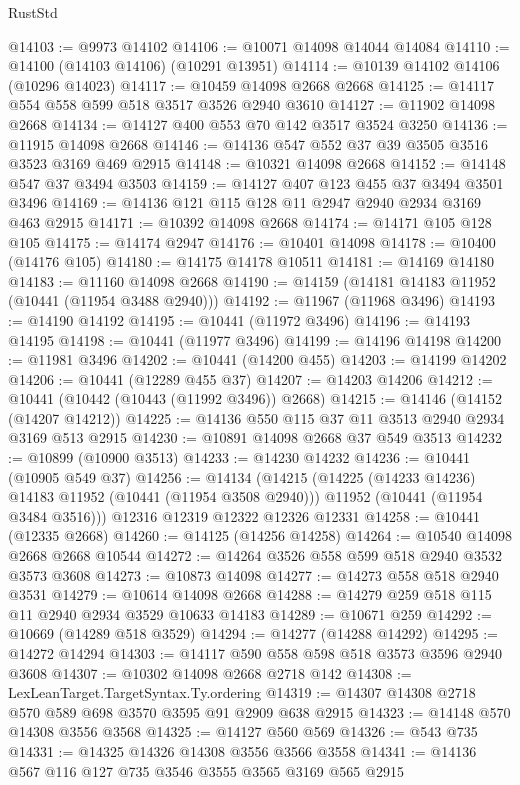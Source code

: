 \begin{lexlean}{RustStd}
\begin{coremodule}
@14103 := @9973 @14102
@14106 := @10071 @14098 @14044 @14084
@14110 := @14100 (@14103 @14106) (@10291 @13951)
@14114 := @10139 @14102 @14106 (@10296 @14023)
@14117 := @10459 @14098 @2668 @2668
@14125 := @14117 @554 @558 @599 @518 @3517 @3526 @2940 @3610
@14127 := @11902 @14098 @2668
@14134 := @14127 @400 @553 @70 @142 @3517 @3524 @3250
@14136 := @11915 @14098 @2668
@14146 := @14136 @547 @552 @37 @39 @3505 @3516 @3523 @3169 @469 @2915
@14148 := @10321 @14098 @2668
@14152 := @14148 @547 @37 @3494 @3503
@14159 := @14127 @407 @123 @455 @37 @3494 @3501 @3496
@14169 := @14136 @121 @115 @128 @11 @2947 @2940 @2934 @3169 @463 @2915
@14171 := @10392 @14098 @2668
@14174 := @14171 @105 @128 @105
@14175 := @14174 @2947
@14176 := @10401 @14098
@14178 := @10400 (@14176 @105)
@14180 := @14175 @14178 @10511
@14181 := @14169 @14180
@14183 := @11160 @14098 @2668
@14190 := @14159 (@14181 @14183 @11952 (@10441 (@11954 @3488 @2940)))
@14192 := @11967 (@11968 @3496)
@14193 := @14190 @14192
@14195 := @10441 (@11972 @3496)
@14196 := @14193 @14195
@14198 := @10441 (@11977 @3496)
@14199 := @14196 @14198
@14200 := @11981 @3496
@14202 := @10441 (@14200 @455)
@14203 := @14199 @14202
@14206 := @10441 (@12289 @455 @37)
@14207 := @14203 @14206
@14212 := @10441 (@10442 (@10443 (@11992 @3496)) @2668)
@14215 := @14146 (@14152 (@14207 @14212))
@14225 := @14136 @550 @115 @37 @11 @3513 @2940 @2934 @3169 @513 @2915
@14230 := @10891 @14098 @2668 @37 @549 @3513
@14232 := @10899 (@10900 @3513)
@14233 := @14230 @14232
@14236 := @10441 (@10905 @549 @37)
@14256 := @14134
    (@14215
      (@14225 (@14233 @14236) @14183 @11952 (@10441 (@11954 @3508 @2940)))
      @11952
      (@10441 (@11954 @3484 @3516)))
    @12316
    @12319
    @12322
    @12326
    @12331
@14258 := @10441 (@12335 @2668)
@14260 := @14125 (@14256 @14258)
@14264 := @10540 @14098 @2668 @2668 @10544
@14272 := @14264 @3526 @558 @599 @518 @2940 @3532 @3573 @3608
@14273 := @10873 @14098
@14277 := @14273 @558 @518 @2940 @3531
@14279 := @10614 @14098 @2668
@14288 := @14279 @259 @518 @115 @11 @2940 @2934 @3529 @10633 @14183
@14289 := @10671 @259
@14292 := @10669 (@14289 @518 @3529)
@14294 := @14277 (@14288 @14292)
@14295 := @14272 @14294
@14303 := @14117 @590 @558 @598 @518 @3573 @3596 @2940 @3608
@14307 := @10302 @14098 @2668 @2718 @142
@14308 := LexLeanTarget.TargetSyntax.Ty.ordering
@14319 := @14307 @14308 @2718 @570 @589 @698 @3570 @3595 @91 @2909 @638 @2915
@14323 := @14148 @570 @14308 @3556 @3568
@14325 := @14127 @560 @569
@14326 := @543 @735
@14331 := @14325 @14326 @14308 @3556 @3566 @3558
@14341 := @14136 @567 @116 @127 @735 @3546 @3555 @3565 @3169 @565 @2915

\end{coremodule}
\end{lexlean}
